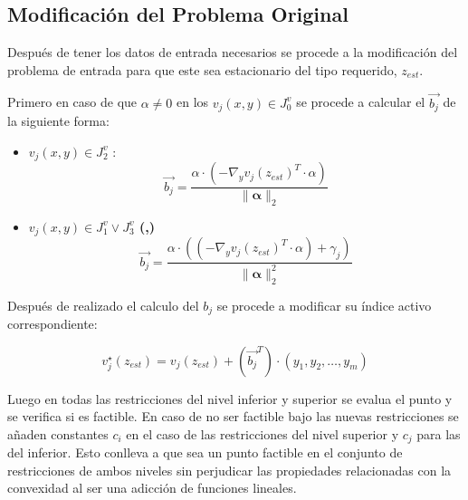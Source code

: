 
\subsection{Modificación del Problema Original}
Después de tener los datos de entrada necesarios se procede a la modificación
del problema de entrada para que este sea estacionario del tipo requerido, $z_{est}$.

Primero en caso de que $\alpha \neq 0$ en los $v_j(x,y) \in J_0^v$ se procede a calcular el $\vec{b_j}$ de la siguiente forma:

\begin{itemize}
    \item \textbf{ $v_j(x,y) \in J_2^v$ }:
        \begin{equation}
            \vec{b_j}=  \frac{{\alpha} \cdot (-\nabla_{y}{v_j(z_{est})}^T \cdot \alpha)}{\|\mathbf{\alpha} \|_2}
        \end{equation}
    \item \textbf{$v_j(x,y) \in J_1^v \lor J_3^v$ (,)}\\
    \begin{equation}
        \vec{b_j}=  \frac{{\alpha} \cdot ((-\nabla_{y}{v_j(z_{est})}^T \cdot \alpha)+\gamma_j)}{\|\mathbf{\alpha} \|_2^2}
    \end{equation}
\end{itemize}


Después de realizado el calculo del $b_j$ se procede a modificar su índice activo correspondiente:

\begin{equation}
	v_{j}^{\star}(z_{est})=v_{j}(z_{est})+ ({\vec{b_j}}^T)\cdot (y_1,y_2,\dots,y_m)
\end{equation}


Luego en todas las restricciones del nivel inferior y superior
se evalua el punto y se verifica si es factible. En caso de no ser factible 
bajo las nuevas restricciones se añaden constantes $c_i$ en el caso de las restricciones del
nivel superior y $c_j$ para las del inferior. Esto conlleva a que sea un punto factible en el conjunto
de restricciones de ambos niveles sin perjudicar las propiedades relacionadas con la convexidad al ser una adicción
de funciones lineales. 

